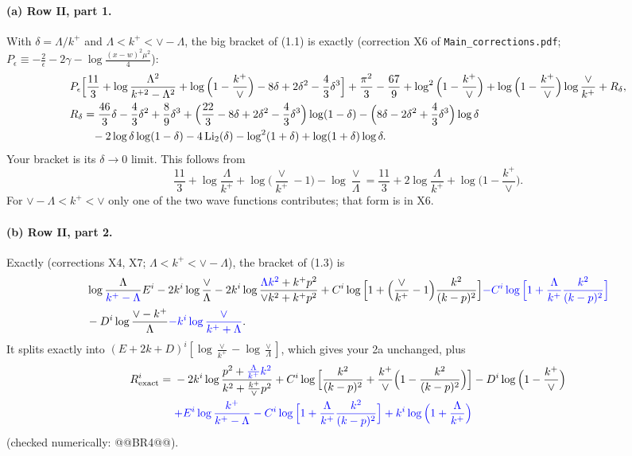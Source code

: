 \documentclass[10pt]{article}
\numberwithin{equation}{section}
\newcommand{\new}[1]{{\color{blue}#1}}
\begin{document}
\paragraph{(a) Row II, part 1.} With $\delta=\Lambda/k^+$ and $\Lambda<k^+<\vee-\Lambda$, the big bracket of (1.1) is exactly (correction X6 of \texttt{Main\_corrections.pdf}; $P_\epsilon\equiv-\frac2\epsilon-2\gamma-\log\frac{(x-w)^2\mu^2}{4}$):
\begin{align}
&P_\epsilon\Big[\frac{11}{3}+\log\frac{\Lambda^2}{k^{+2}-\Lambda^2}+\log\Big(1-\frac{k^+}{\vee}\Big)-8\delta+2\delta^2-\frac43\delta^3\Big]+\frac{\pi^2}{3}-\frac{67}{9}+\log^2\Big(1-\frac{k^+}{\vee}\Big)+\log\Big(1-\frac{k^+}{\vee}\Big)\log\frac{\vee}{k^+}+R_\delta,\notag\\
&R_\delta=\frac{46}{3}\delta-\frac43\delta^2+\frac89\delta^3+\Big(\frac{22}{3}-8\delta+2\delta^2-\frac43\delta^3\Big)\log(1-\delta)-\Big(8\delta-2\delta^2+\frac43\delta^3\Big)\log\delta\notag\\
&\qquad-2\log\delta\log(1-\delta)-4\,{\rm Li}_2(\delta)-\log^2(1+\delta)+\log(1+\delta)\log\delta.
\end{align}
Your bracket is its $\delta\to0$ limit. This follows from
\begin{equation}
\frac{11}{3}+\log\frac{\Lambda}{k^+}+\log\Big(\frac{\vee}{k^+}-1\Big)-\log\frac{\vee}{\Lambda}=\frac{11}{3}+2\log\frac{\Lambda}{k^+}+\log\Big(1-\frac{k^+}{\vee}\Big).
\end{equation}
For $\vee-\Lambda<k^+<\vee$ only one of the two wave functions contributes; that form is in X6.

\paragraph{(b) Row II, part 2.} Exactly (corrections X4, X7; $\Lambda<k^+<\vee-\Lambda$), the bracket of (1.3) is
\begin{align}
&\log\frac{\Lambda}{\new{k^+-\Lambda}}E^i-2k^i\log\frac{\vee}{\Lambda}-2k^i\log\frac{\new{\Lambda k^2}+k^+p^2}{\vee k^2+k^+p^2}+C^i\log\Big[1+\Big(\frac{\vee}{k^+}-1\Big)\frac{k^2}{(k-p)^2}\Big]\new{-C^i\log\Big[1+\frac{\Lambda}{k^+}\frac{k^2}{(k-p)^2}\Big]}\notag\\
&-D^i\log\frac{\vee-k^+}{\Lambda}\new{-k^i\log\frac{\vee}{k^++\Lambda}}.
\end{align}
It splits exactly into $(E+2k+D)^i[\log\frac{\vee}{k^+}-\log\frac{\vee}{\Lambda}]$, which gives your 2a unchanged, plus
\begin{align}
R^i_{\rm exact}={}&-2k^i\log\frac{p^2+\new{\frac{\Lambda}{k^+}k^2}}{k^2+\frac{k^+}{\vee}p^2}+C^i\log\Big[\frac{k^2}{(k-p)^2}+\frac{k^+}{\vee}\Big(1-\frac{k^2}{(k-p)^2}\Big)\Big]-D^i\log\Big(1-\frac{k^+}{\vee}\Big)\notag\\
&\new{+E^i\log\frac{k^+}{k^+-\Lambda}-C^i\log\Big[1+\frac{\Lambda}{k^+}\frac{k^2}{(k-p)^2}\Big]+k^i\log\Big(1+\frac{\Lambda}{k^+}\Big)}
\end{align}
(checked numerically: @@BR4@@).
\end{document}
